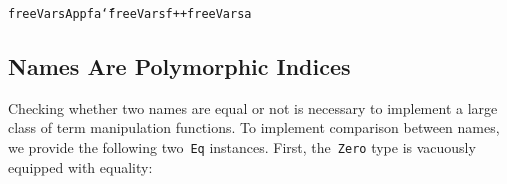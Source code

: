 \documentclass[9pt,preprint,authoryear]{sigplanconf}
\begin{document}
{{{}\vphantom{$\{$}}}\textcolor[rgb]{0,0,0.80}{\texttt{freeVars}}\textcolor[rgb]{0,0,0.80}{\texttt{\mbox{\hspace{0.50em}}}}\textcolor[cmyk]{0,0.65,0.99,0}{\texttt{\makebox[1.22ex][l]{$ {(} $}}}\textcolor[rgb]{0.70,0.13,0.13}{\texttt{App}}\textcolor[rgb]{0,0,0.80}{\texttt{\mbox{\hspace{0.50em}}}}\textcolor[rgb]{0,0,0.80}{\texttt{f}}\textcolor[rgb]{0,0,0.80}{\texttt{\mbox{\hspace{0.50em}}}}\textcolor[rgb]{0,0,0.80}{\texttt{a}}\textcolor[cmyk]{0,0.65,0.99,0}{\texttt{\makebox[1.22ex][r]{$ {)} $}}}\textcolor[rgb]{0,0,0.80}{\texttt{\mbox{\hspace{0.50em}}}}\textcolor[cmyk]{0,0.65,0.99,0}{\texttt{{\char `\=}}}\textcolor[rgb]{0,0,0.80}{\texttt{\mbox{\hspace{0.50em}}}}\textcolor[rgb]{0,0,0.80}{\texttt{freeVars}}\textcolor[rgb]{0,0,0.80}{\texttt{\mbox{\hspace{0.50em}}}}\textcolor[rgb]{0,0,0.80}{\texttt{f}}\textcolor[rgb]{0,0,0.80}{\texttt{\mbox{\hspace{0.50em}}}}\textcolor[rgb]{0,0,0.80}{\texttt{++}}\textcolor[rgb]{0,0,0.80}{\texttt{\mbox{\hspace{0.50em}}}}\textcolor[rgb]{0,0,0.80}{\texttt{freeVars}}\textcolor[rgb]{0,0,0.80}{\texttt{\mbox{\hspace{0.50em}}}}\textcolor[rgb]{0,0,0.80}{\texttt{a}}\textcolor[rgb]{0,0,0.80}{\texttt{{\nopagebreak \newline%
}\vphantom{$\{$}}}%


\subsection{Names Are Polymorphic Indices}

%
Checking whether two names are equal or not is necessary to implement a large 
    class of term manipulation functions.
    To implement comparison between names, we provide the following two{~}\textcolor[rgb]{0,0,0.80}{\texttt{Eq}} instances.
    First, the{~}\textcolor[rgb]{0,0,0.80}{\texttt{Zero}} type is vacuously equipped with equality{:}%


{\nopagebreak }
\end{document}
